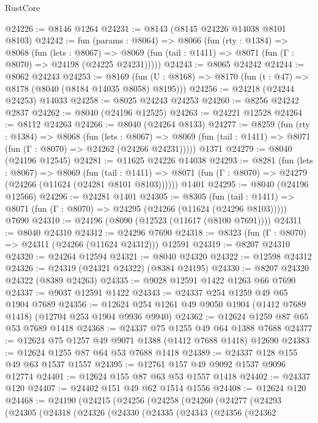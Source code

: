 \begin{lexlean}{RustCore}
\begin{coremodule}
@24226 := @8146 @1264
@24231 := @8143 (@8145 @24226 @14038 @8101 @8103)
@24242 := fun (params : @8064) =>
  @8066
    (fun (rty : @1384) =>
    @8068
      (fun (lets : @8067) =>
      @8069 (fun (tail : @1411) => @8071 (fun (Γ : @8070) => @24198 (@24225 @24231)))))
@24243 := @8065 @24242
@24244 := @8062 @24243
@24253 := @8169
    (fun (U : @8168) => @8170 (fun (t : @47) => @8178 (@8040 (@8184 @14035 @8058) @8195)))
@24256 := @24218 (@24244 @24253) @14033
@24258 := @8025 @24243 @24253
@24260 := @8256 @24242 @2837
@24262 := @8040 (@24196 @12525)
@24263 := @24221 @12528
@24264 := @8112 @24263
@24266 := @8040 (@24264 @8133)
@24277 := @8259
    (fun (rty : @1384) =>
    @8068
      (fun (lets : @8067) =>
      @8069 (fun (tail : @1411) => @8071 (fun (Γ : @8070) => @24262 (@24266 @24231)))))
    @1371
@24279 := @8040 (@24196 @12545)
@24281 := @11625 @24226 @14038
@24293 := @8281
    (fun (lets : @8067) =>
    @8069
      (fun (tail : @1411) =>
      @8071 (fun (Γ : @8070) => @24279 (@24266 (@11624 (@24281 @8101 @8103))))))
    @1401
@24295 := @8040 (@24196 @12566)
@24296 := @24281 @1401
@24305 := @8305
    (fun (tail : @1411) => @8071 (fun (Γ : @8070) => @24295 (@24266 (@11624 (@24296 @8103)))))
    @7690
@24310 := @24196 (@8090 (@12523 (@11617 (@8100 @7691))))
@24311 := @8040 @24310
@24312 := @24296 @7690
@24318 := @8323 (fun (Γ : @8070) => @24311 (@24266 (@11624 @24312))) @12591
@24319 := @8207 @24310
@24320 := @24264 @12594
@24321 := @8040 @24320
@24322 := @12598 @24312
@24326 := @24319 (@24321 @24322) (@8384 @24195)
@24330 := @8207 @24320 @24322 (@8389 @24263)
@24335 := @9028 @12591 @1422 @1263 @66 @7690
@24337 := @9037 @12591 @1422
@24343 := @24337 @254 @1259 @49 @65 @1904 @7689
@24356 := @12624 @254 @1261 @49 @9050 @1904 (@1412 @7689 @1418) (@12704 @253 @1904 @9936 @9940)
@24362 := @12624 @1259 @87 @65 @53 @7689 @1418
@24368 := @24337 @75 @1255 @49 @64 @1388 @7688
@24377 := @12624 @75 @1257 @49 @9071 @1388 (@1412 @7688 @1418) @12690
@24383 := @12624 @1255 @87 @64 @53 @7688 @1418
@24389 := @24337 @128 @155 @49 @63 @1537 @1557
@24395 := @12761 @157 @49 @9092 @1537 @9096 @12774
@24401 := @12624 @155 @87 @63 @53 @1557 @1418
@24402 := @24337 @120
@24407 := @24402 @151 @49 @62 @1514 @1556
@24408 := @12624 @120
@24468 := @24190
    (@24215
      (@24256
        (@24258
          (@24260
            (@24277
              (@24293
                (@24305
                  (@24318
                    (@24326
                      (@24330
                        (@24335
                          (@24343
                            (@24356
                              (@24362

\end{coremodule}
\end{lexlean}
